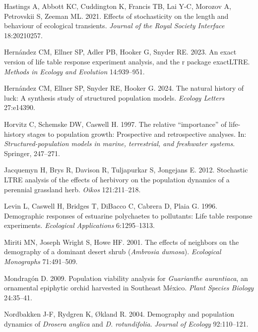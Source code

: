 \documentclass[
  12pt,
  letterpaper,
]{book}
\newlength{\cslhangindent}
\newenvironment{CSLReferences}[2] %
 {\begin{list}{}{%
  \setlength{\itemindent}{0pt}
  \setlength{\leftmargin}{0pt}
  \setlength{\parsep}{0pt}
  \ifodd #1
   \setlength{\leftmargin}{\cslhangindent}
   \setlength{\itemindent}{-1\cslhangindent}
  \fi
  \setlength{\itemsep}{#2\baselineskip}}}
 {\end{list}}
\begin{document}
\begin{CSLReferences}{1}{0}
Hastings A, Abbott KC, Cuddington K, Francis TB, Lai Y-C, Morozov A,
Petrovskii S, Zeeman ML. 2021. Effects of stochasticity on the length
and behaviour of ecological transients. \emph{Journal of the Royal
Society Interface} 18:20210257.

Hernández CM, Ellner SP, Adler PB, Hooker G, Snyder RE. 2023. An exact
version of life table response experiment analysis, and the r package
exactLTRE. \emph{Methods in Ecology and Evolution} 14:939--951.

Hernández CM, Ellner SP, Snyder RE, Hooker G. 2024. The natural history
of luck: A synthesis study of structured population models.
\emph{Ecology Letters} 27:e14390.

Horvitz C, Schemske DW, Caswell H. 1997. The relative {``importance''}
of life-history stages to population growth: Prospective and
retrospective analyses. In: \emph{Structured-population models in
marine, terrestrial, and freshwater systems}. Springer, 247--271.

Jacquemyn H, Brys R, Davison R, Tuljapurkar S, Jongejans E. 2012.
Stochastic LTRE analysis of the effects of herbivory on the population
dynamics of a perennial grassland herb. \emph{Oikos} 121:211--218.

Levin L, Caswell H, Bridges T, DiBacco C, Cabrera D, Plaia G. 1996.
Demographic responses of estuarine polychaetes to pollutants: Life table
response experiments. \emph{Ecological Applications} 6:1295--1313.

Miriti MN, Joseph Wright S, Howe HF. 2001. The effects of neighbors on
the demography of a dominant desert shrub (\emph{{A}mbrosia {d}umosa}).
\emph{Ecological Monographs} 71:491--509.

Mondragón D. 2009. Population viability analysis for \emph{{G}uarianthe
{a}urantiaca}, an ornamental epiphytic orchid harvested in {S}outheast
{M}{é}xico. \emph{Plant Species Biology} 24:35--41.

Nordbakken J-F, Rydgren K, Økland R. 2004. Demography and population
dynamics of \emph{{D}rosera {a}nglica} and \emph{{D}. {r}otundifolia}.
\emph{Journal of Ecology} 92:110--121.


\end{CSLReferences}
\end{document}
